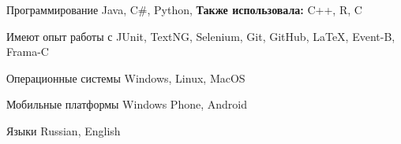 


\begin{cvskills}


\cvskill
{Программирование} %
{Java, C\#, Python, \textbf{Также использовала:} C++, R, C} %

\cvskill
{Имеют опыт работы с} %
{JUnit, TextNG, Selenium, Git, GitHub, LaTeX, Event-B, Frama-C} %

\cvskill
{Операционные системы} %
{Windows, Linux, MacOS} %

\cvskill
{Мобильные платформы} %
{Windows Phone, Android} %


\cvskill
{Языки} %
{Russian, English} %


\end{cvskills}